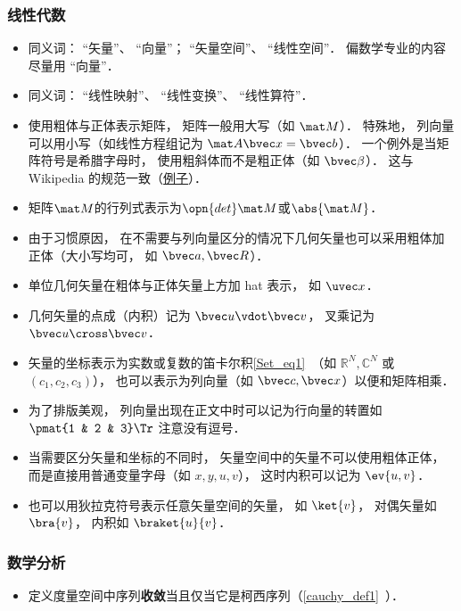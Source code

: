 \subsubsection{线性代数}
\begin{itemize}
\item 同义词： “矢量”、 “向量”； “矢量空间”、 “线性空间”． 偏数学专业的内容尽量用 “向量”．
\item 同义词： “线性映射”、 “线性变换”、 “线性算符”．
\item 使用粗体与正体表示矩阵， 矩阵一般用大写（如 $\mat M$）． 特殊地， 列向量可以用小写（如线性方程组记为 $\mat A \bvec x = \bvec b$）． 一个例外是当矩阵符号是希腊字母时， 使用粗斜体而不是粗正体（如 $\bvec \beta$）． 这与 Wikipedia 的规范一致（\href{https://en.wikipedia.org/wiki/Angular_acceleration}{例子}）．
\item 矩阵$\mat M$的行列式表示为$\opn{det}\mat M$或$\abs{\mat M}$．
\item 由于习惯原因， 在不需要与列向量区分的情况下几何矢量也可以采用粗体加正体（大小写均可， 如 $\bvec a, \bvec R$）．
\item 单位几何矢量在粗体与正体矢量上方加 hat 表示， 如 $\uvec x$．
\item 几何矢量的点成（内积）记为 $\bvec u \vdot \bvec v$， 叉乘记为 $\bvec u \cross \bvec v$．
\item 矢量的坐标表示为实数或复数的笛卡尔积\autoref{Set_eq1}~（如 $\mathbb R^N, \mathbb C^N$ 或 $(c_1, c_2, c_3)$）， 也可以表示为列向量（如 $\bvec c, \bvec x$）以便和矩阵相乘．
\item 为了排版美观， 列向量出现在正文中时可以记为行向量的转置如 $\pmat{1 & 2 & 3}\Tr$ 注意没有逗号．
\item 当需要区分矢量和坐标的不同时， 矢量空间中的矢量不可以使用粗体正体， 而是直接用普通变量字母（如 $x, y, u, v$）， 这时内积可以记为 $\ev{u, v}$．
\item 也可以用狄拉克符号表示任意矢量空间的矢量， 如 $\ket{v}$， 对偶矢量如 $\bra{v}$， 内积如 $\braket{u}{v}$．
\end{itemize}

\subsubsection{数学分析}
\begin{itemize}
\item 定义度量空间中序列\textbf{收敛}当且仅当它是柯西序列（\autoref{cauchy_def1}~）．
\end{itemize}

